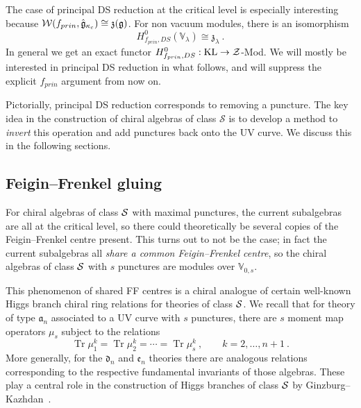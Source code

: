 \documentclass[a4paper]{article}
\def\IV{\mathbb{V}}
\def\SS{{\cal S}}
\def\WW{{\cal W}}
\def\ZZ{{\cal Z}}
\def\Tr{\mathop{\mathrm{Tr}}\nolimits}
\def\af{\mathfrak{a}}
\def\df{\mathfrak{d}}
\def\ef{\mathfrak{e}}
\def\gf{\mathfrak{g}}
\def \zf{\mathfrak{z}}
\def \KL{\mathrm{KL}}
\begin{document}
The case of principal DS reduction at the critical level is especially interesting because $\WW(f_{prin},\hat{\gf}_{\kappa_c})\cong \zf(\gf)$. For non vacuum modules, there is an isomorphism~\cite{Frenkel:2010}
\begin{equation}\label{eq:ds_weyl}
	H^0_{f_{prin},DS}(\IV_\lambda) \cong \zf_\lambda~.
\end{equation}
In general we get an exact functor $H^0_{f_{prin},DS}: \KL\rightarrow \ZZ$-Mod. We will mostly be interested in principal DS reduction in what follows, and will suppress the explicit $f_{prin}$ argument from now on. 

Pictorially, principal DS reduction corresponds to removing a puncture. The key idea in the construction of chiral algebras of class $\mathcal{S}$ is to develop a method to \emph{invert} this operation and add punctures back onto the UV curve. We discuss this in the following sections.

\subsection{Feigin--Frenkel gluing}
\label{ssec:chiral_background/ff-gluing}

For chiral algebras of class $\SS$ with maximal punctures, the current subalgebras are all at the critical level, so there could theoretically be several copies of the Feigin--Frenkel centre present. This turns out to not be the case; in fact the current subalgebras all \emph{share a common Feigin--Frenkel centre}, so the chiral algebras of class $\SS$ with $s$ punctures are modules over $\IV_{0,s}$.

This phenomenon of shared FF centres is a chiral analogue of certain well-known Higgs branch chiral ring relations for theories of class $\SS$. We recall that for theory of type $\af_n$ associated to a UV curve with $s$ punctures, there are $s$ moment map operators $\mu_s$ subject to the relations
\begin{equation}\label{eq:Higgs_FF_relations}
	\Tr \mu_1^k=\Tr \mu_2^k=\cdots=\Tr \mu_s^k~,\qquad k=2,\ldots,n+1~.
\end{equation}
More generally, for the $\df_n$ and $\ef_n$ theories there are analogous relations corresponding to the respective fundamental invariants of those algebras. These play a central role in the construction of Higgs branches of class $\SS$ by Ginzburg--Kazhdan~\cite{Ginzburg:2018}.
\end{document}
